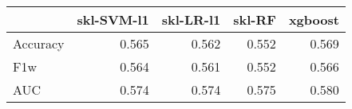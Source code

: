 \begin{tabular}{lrrrr}
\toprule
{} &  skl-SVM-l1 &  skl-LR-l1 &  skl-RF &  xgboost \\
\midrule
Accuracy &       0.565 &      0.562 &   0.552 &    0.569 \\
F1w      &       0.564 &      0.561 &   0.552 &    0.566 \\
AUC      &       0.574 &      0.574 &   0.575 &    0.580 \\
\bottomrule
\end{tabular}

